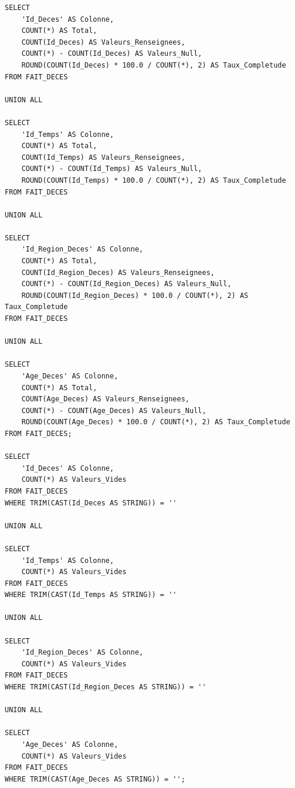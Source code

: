\begin{verbatim}
SELECT
    'Id_Deces' AS Colonne,
    COUNT(*) AS Total,
    COUNT(Id_Deces) AS Valeurs_Renseignees,
    COUNT(*) - COUNT(Id_Deces) AS Valeurs_Null,
    ROUND(COUNT(Id_Deces) * 100.0 / COUNT(*), 2) AS Taux_Completude
FROM FAIT_DECES

UNION ALL

SELECT
    'Id_Temps' AS Colonne,
    COUNT(*) AS Total,
    COUNT(Id_Temps) AS Valeurs_Renseignees,
    COUNT(*) - COUNT(Id_Temps) AS Valeurs_Null,
    ROUND(COUNT(Id_Temps) * 100.0 / COUNT(*), 2) AS Taux_Completude
FROM FAIT_DECES

UNION ALL

SELECT
    'Id_Region_Deces' AS Colonne,
    COUNT(*) AS Total,
    COUNT(Id_Region_Deces) AS Valeurs_Renseignees,
    COUNT(*) - COUNT(Id_Region_Deces) AS Valeurs_Null,
    ROUND(COUNT(Id_Region_Deces) * 100.0 / COUNT(*), 2) AS Taux_Completude
FROM FAIT_DECES

UNION ALL

SELECT
    'Age_Deces' AS Colonne,
    COUNT(*) AS Total,
    COUNT(Age_Deces) AS Valeurs_Renseignees,
    COUNT(*) - COUNT(Age_Deces) AS Valeurs_Null,
    ROUND(COUNT(Age_Deces) * 100.0 / COUNT(*), 2) AS Taux_Completude
FROM FAIT_DECES;

SELECT
    'Id_Deces' AS Colonne,
    COUNT(*) AS Valeurs_Vides
FROM FAIT_DECES
WHERE TRIM(CAST(Id_Deces AS STRING)) = ''

UNION ALL

SELECT
    'Id_Temps' AS Colonne,
    COUNT(*) AS Valeurs_Vides
FROM FAIT_DECES
WHERE TRIM(CAST(Id_Temps AS STRING)) = ''

UNION ALL

SELECT
    'Id_Region_Deces' AS Colonne,
    COUNT(*) AS Valeurs_Vides
FROM FAIT_DECES
WHERE TRIM(CAST(Id_Region_Deces AS STRING)) = ''

UNION ALL

SELECT
    'Age_Deces' AS Colonne,
    COUNT(*) AS Valeurs_Vides
FROM FAIT_DECES
WHERE TRIM(CAST(Age_Deces AS STRING)) = '';
\end{verbatim}
